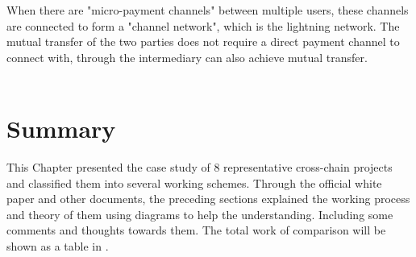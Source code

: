 \noindent When there are "micro-payment channels" between multiple users, these channels are connected to form a "channel network", which is the lightning network. The mutual transfer of the two parties does not require a direct payment channel to connect with, through the intermediary can also achieve mutual transfer. \\ \\




















\section{Summary}
\noindent This Chapter presented the case study of 8 representative cross-chain projects and classified them into several working schemes. Through the official white paper and other documents, the preceding sections explained the working process and theory of them using diagrams to help the understanding. Including some comments and thoughts towards them. The total work of comparison will be shown as a table in .


%